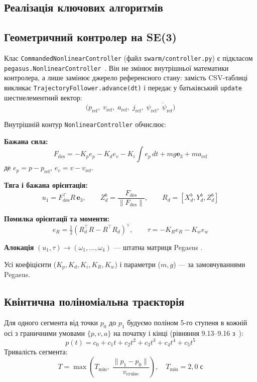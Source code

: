 \subsection*{Реалізація ключових алгоритмів}

\subsection{Геометричний контролер на SE(3)}

Клас \texttt{CommandedNonlinearController} (файл \texttt{swarm/controller.py}) є підкласом \texttt{pegasus.NonlinearController}~\cite{Pegasus2024}. Він не змінює внутрішньої математики контролера, а лише замінює джерело референсного стану: замість CSV-таблиці викликає \texttt{TrajectoryFollower.advance(dt)} і передає у батьківський \texttt{update} шестиелементний вектор:
\[
\bigl(p_{\text{ref}},\; v_{\text{ref}},\; a_{\text{ref}},\; j_{\text{ref}},\; \psi_{\text{ref}},\; \dot{\psi}_{\text{ref}}\bigr)
\]

Внутрішній контур \texttt{NonlinearController} обчислює:

\textbf{Бажана сила:}
\[
F_{\text{des}} = -K_p e_p - K_d e_v - K_i \textstyle\int e_p\,dt + mg\mathbf{e}_3 + m a_{\text{ref}}
\]
де $e_p = p - p_{\text{ref}}$, $e_v = v - v_{\text{ref}}$.

\textbf{Тяга і бажана орієнтація:}
\[
u_1 = F_{\text{des}}^\top R\,\mathbf{e}_3, \qquad
Z^b_d = \frac{F_{\text{des}}}{\|F_{\text{des}}\|}, \qquad
R_d = [X^b_d, Y^b_d, Z^b_d]
\]

\textbf{Помилка орієнтації та моменти:}
\[
e_R = \tfrac{1}{2}(R_d^\top R - R^\top R_d)^\vee, \qquad
\tau = -K_R e_R - K_w e_w
\]

\textbf{Алокація} $(u_1, \tau) \to (\omega_1,\ldots,\omega_4)$ — штатна матриця Pegasus \cite{Pegasus2024}.

Усі коефіцієнти ($K_p, K_d, K_i, K_R, K_w$) і параметри ($m, g$) — за замовчуваннями Pegasus.

\subsection{Квінтична поліноміальна траєкторія}

Для одного сегмента від точки $p_0$ до $p_1$ будуємо поліном 5-го ступеня в кожній осі з граничними умовами $\{p, v, a\}$ на початку і кінці (рівняння 9.13–9.16 з~\cite{Lynch2017}):
\[
p(t) = c_0 + c_1 t + c_2 t^2 + c_3 t^3 + c_4 t^4 + c_5 t^5
\]
Тривалість сегмента:
\[
T = \max\!\left(T_{\min},\; \frac{\|p_1 - p_0\|}{v_{\text{cruise}}}\right), \quad T_{\min} = 2{,}0\;\text{с}
\]

